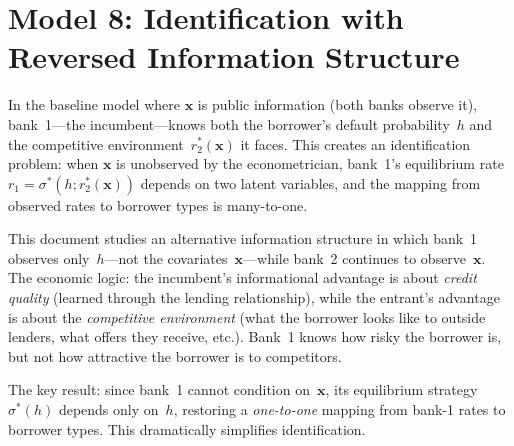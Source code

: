 \documentclass[12pt]{article}
\theoremstyle{plain}
\theoremstyle{plain}
\theoremstyle{definition}
\theoremstyle{remark}
\begin{document}
\section*{Model 8: Identification with Reversed Information Structure}

\medskip

\noindent{}

\bigskip

In the baseline model where $\mathbf{x}$ is public information (both banks observe it), bank~1---the incumbent---knows both the borrower's default probability~$h$ and the competitive environment~$r_2^*(\mathbf{x})$ it faces. This creates an identification problem: when $\mathbf{x}$ is unobserved by the econometrician, bank~1's equilibrium rate $r_1 = \sigma^*(h; r_2^*(\mathbf{x}))$ depends on two latent variables, and the mapping from observed rates to borrower types is many-to-one.

This document studies an alternative information structure in which bank~1 observes only~$h$---not the covariates~$\mathbf{x}$---while bank~2 continues to observe~$\mathbf{x}$.  The economic logic: the incumbent's informational advantage is about \emph{credit quality} (learned through the lending relationship), while the entrant's advantage is about the \emph{competitive environment} (what the borrower looks like to outside lenders, what offers they receive, etc.).  Bank~1 knows how risky the borrower is, but not how attractive the borrower is to competitors.

The key result: since bank~1 cannot condition on~$\mathbf{x}$, its equilibrium strategy $\sigma^*(h)$ depends only on~$h$, restoring a \emph{one-to-one} mapping from bank-1 rates to borrower types.  This dramatically simplifies identification.
\end{document}
